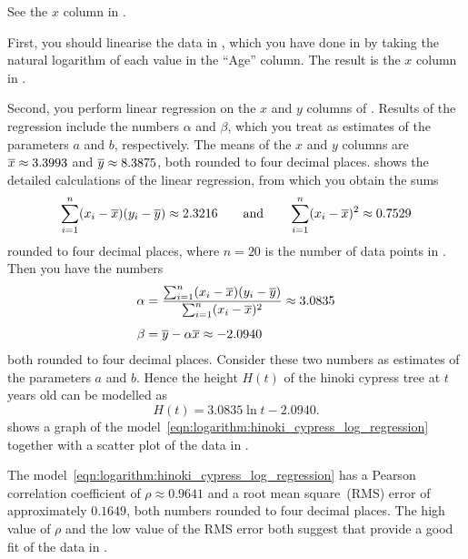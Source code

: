 \documentclass[a4paper,oneside,12pt]{article}
\begin{document}
\begin{solution}
See the $x$ column in
.

First, you should linearise the data in
, which you have done
in  by taking
the natural logarithm of each value in the ``Age'' column.  The result
is the $x$ column in
.

Second, you perform linear regression on the $x$ and $y$ columns of
.  Results
of the regression include the numbers $\alpha$ and $\beta$, which you
treat as estimates of the parameters $a$ and $b$, respectively.  The
means of the $x$ and $y$ columns are $\overline{x} \approx 3.3993$ and
$\overline{y} \approx 8.3875$, both rounded to four decimal places.
 shows the
detailed calculations of the linear regression, from which you obtain
the sums
\[
\sum_{i=1}^n (x_i - \overline{x}) (y_i - \overline{y})
\approx
2.3216
\qquad
\text{and}
\qquad
\sum_{i=1}^n (x_i - \overline{x})^2
\approx
0.7529
\]
rounded to four decimal places, where $n = 20$ is the number of data
points in .  Then you have the
numbers
\begin{align*}
\alpha
&=
\frac{
  \sum_{i=1}^n (x_i - \overline{x}) (y_i - \overline{y})
}{
  \sum_{i=1}^n (x_i - \overline{x})^2
}
\approx
3.0835 \\[4pt]
\beta
&=
\overline{y} - \alpha\overline{x}
\approx
-2.0940
\end{align*}
both rounded to four decimal places.  Consider these two numbers as
estimates of the parameters $a$ and $b$.  Hence the height $H(t)$ of
the hinoki cypress tree at $t$ years old can be modelled as
\begin{equation}
\label{eqn:logarithm:hinoki_cypress_log_regression}
H(t)
=
3.0835 \ln t - 2.0940.
\end{equation}
 shows a graph of the
model~\eqref{eqn:logarithm:hinoki_cypress_log_regression} together
with a scatter plot of the data in
.

The model~\eqref{eqn:logarithm:hinoki_cypress_log_regression} has a
Pearson correlation coefficient of $\rho \approx 0.9641$ and a root
mean square~(RMS) error of approximately $0.1649$, both numbers
rounded to four decimal places.  The high value of $\rho$ and the low
value of the RMS error both suggest that
 provide a good
fit of the data in .
\end{solution}
\end{document}
